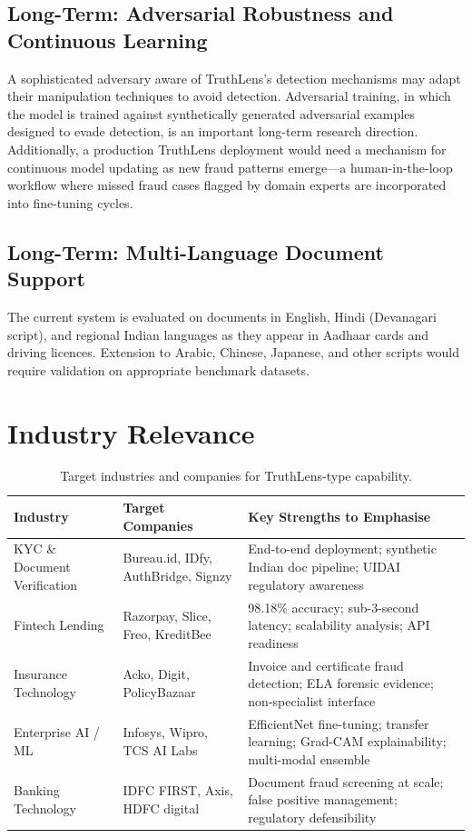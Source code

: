 \documentclass[12pt,a4paper,oneside]{report}
\begin{document}
\subsection{Long-Term: Adversarial Robustness and Continuous Learning}

A sophisticated adversary aware of TruthLens's detection mechanisms may adapt
their manipulation techniques to avoid detection. Adversarial training, in which
the model is trained against synthetically generated adversarial examples designed
to evade detection, is an important long-term research direction. Additionally,
a production TruthLens deployment would need a mechanism for continuous model
updating as new fraud patterns emerge---a human-in-the-loop workflow where missed
fraud cases flagged by domain experts are incorporated into fine-tuning cycles.

\subsection{Long-Term: Multi-Language Document Support}

The current system is evaluated on documents in English, Hindi (Devanagari
script), and regional Indian languages as they appear in Aadhaar cards and
driving licences. Extension to Arabic, Chinese, Japanese, and other scripts
would require validation on appropriate benchmark datasets.

\section{Industry Relevance}

\begin{table}[H]
\centering
\caption{Target industries and companies for TruthLens-type capability.}
\label{tab:industry}
\renewcommand{\arraystretch}{1.3}
\begin{tabularx}{\textwidth}{p{2.8cm}p{3.5cm}X}
\toprule
\textbf{Industry} & \textbf{Target Companies} & \textbf{Key Strengths to Emphasise} \\
\midrule
KYC \& Document Verification & Bureau.id, IDfy, AuthBridge, Signzy & End-to-end deployment; synthetic Indian doc pipeline; UIDAI regulatory awareness \\
Fintech Lending              & Razorpay, Slice, Freo, KreditBee   & 98.18\% accuracy; sub-3-second latency; scalability analysis; API readiness \\
Insurance Technology         & Acko, Digit, PolicyBazaar           & Invoice and certificate fraud detection; ELA forensic evidence; non-specialist interface \\
Enterprise AI / ML           & Infosys, Wipro, TCS AI Labs         & EfficientNet fine-tuning; transfer learning; Grad-CAM explainability; multi-modal ensemble \\
Banking Technology           & IDFC FIRST, Axis, HDFC digital      & Document fraud screening at scale; false positive management; regulatory defensibility \\
\bottomrule
\end{tabularx}
\end{table}
\end{document}
